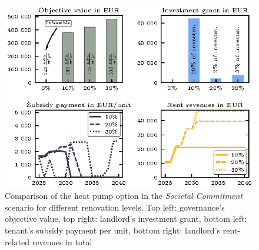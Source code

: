 \begin{figure}[h]
	\centering
	\includegraphics[width=0.9\linewidth]{figures/4_Results/fig_retrofitting/retrofitting.eps}
	\caption{Comparison of the heat pump option in the \textit{Societal Commitment} scenario for different renovation levels. Top left: governance's objective value, top right: landlord's investment grant, bottom left: tenant's subsidy payment per unit, bottom right: landlord's rent-related revenues in total}
	\label{fig:retrofitting}
\end{figure}

